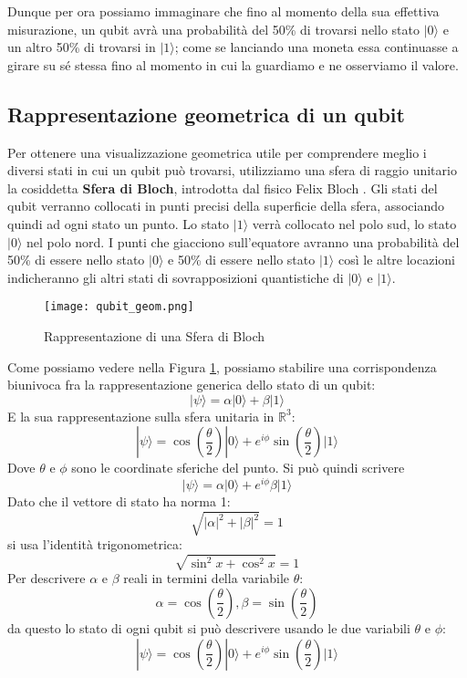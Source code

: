 Dunque per ora possiamo immaginare che fino al momento della sua effettiva misurazione, un qubit avrà una probabilità del 50\% di trovarsi nello stato \( | 0 \rangle \) e un altro 50\% di trovarsi in \( | 1 \rangle \); come se lanciando una moneta essa continuasse a girare su sé stessa fino al momento in cui la guardiamo e ne osserviamo il valore.

\subsection{Rappresentazione geometrica di un qubit}
Per ottenere una visualizzazione geometrica utile per comprendere meglio i diversi stati in cui un qubit può trovarsi, utilizziamo una sfera di raggio unitario la cosiddetta \textbf{Sfera di Bloch}, introdotta dal fisico Felix Bloch \cite{bloch_sphere}.
Gli stati del qubit verranno collocati in punti precisi della superficie della sfera, associando quindi ad ogni stato un punto. Lo stato \( | 1 \rangle \) verrà collocato nel polo sud, lo stato \( | 0 \rangle \) nel polo nord. I punti che giacciono sull'equatore avranno una probabilità del 50\% di essere nello stato \( | 0 \rangle \) e 50\% di essere nello stato \( | 1 \rangle \) così le altre locazioni indicheranno gli altri stati di sovrapposizioni quantistiche di \( | 0 \rangle \) e \( | 1 \rangle \).

\begin{figure}[h]
  \centering
  \texttt{[image: qubit\_geom.png]}
  \caption{Rappresentazione di una Sfera di Bloch}
  \label{fig:qubit_geom}
\end{figure}

Come possiamo vedere nella Figura \ref{fig:qubit_geom}, possiamo stabilire una corrispondenza biunivoca fra la rappresentazione generica dello stato di un qubit:
\[
  | \psi \rangle
  = \alpha | 0 \rangle
  + \beta | 1 \rangle
\]
E la sua rappresentazione sulla sfera unitaria in \( \mathbb{R} ^3 \):
\[
  | \psi \rangle
  = \cos \left( \frac{\theta}{2} \right)
  | 0 \rangle
  + e^{i\phi}
  \sin \left( \frac{\theta}{2} \right)
  | 1 \rangle
\]
Dove \( \theta \) e \( \phi \) sono le coordinate sferiche del punto. Si può quindi scrivere
\[
  | \psi \rangle
  = \alpha | 0 \rangle
  + e^{i\phi} \beta | 1 \rangle
\]
Dato che il vettore di stato ha norma 1:
\[
  \sqrt{
    |\alpha|^2
    + |\beta|^2
  }
  = 1
\]
si usa l'identità trigonometrica:
\[
  \sqrt{
    \sin^2 x
    + \cos^2 x
  }
  = 1
\]
Per descrivere \( \alpha \) e \( \beta \) reali in termini della variabile \( \theta \):
\[
  \alpha = \cos \left( \frac{\theta}{2} \right), 
  \beta = \sin \left( \frac{\theta}{2} \right)
\]
da questo lo stato di ogni qubit si può descrivere usando le due variabili \(\theta\) e \(\phi\):
\[
  | \psi \rangle
  = \cos \left( \frac{\theta}{2} \right) | 0 \rangle
  + e^{i\phi} \sin \left( \frac{\theta}{2} \right) | 1 \rangle
\]

